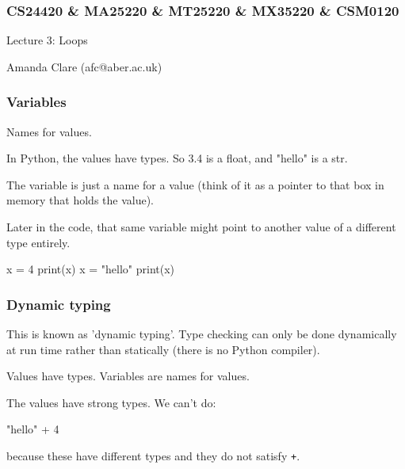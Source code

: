 \documentclass{beamer}
\begin{document}

\begin{frame}
\frametitle{CS24420 \& MA25220 \& MT25220 \& MX35220 \& CSM0120}

\begin{center}
\begin{huge}
Lecture 3: Loops
\end{huge}

\bigskip

Amanda Clare (afc@aber.ac.uk)

\end{center}
\end{frame}


\begin{frame}[fragile]
\frametitle{Variables}
Names for values. 

\bigskip

In Python, the values have types. So 3.4 is a float,
and "hello" is a str. 

\bigskip

The variable is just a name for a value (think
of it as a pointer to that box in memory that holds the value). 

\bigskip

Later in the code, that same variable might point to another value of
a different type entirely.

\begin{code}
x = 4
print(x)
x = "hello"
print(x)
\end{code}

\end{frame}



\begin{frame}[fragile]
\frametitle{Dynamic typing}
This is known as 'dynamic typing'. Type checking can only be done
dynamically at
run time rather than statically (there is no Python compiler). 
 
\bigskip

Values have types. Variables are names for values.

\bigskip

The values have strong types. We can't do: 
\begin{code}
"hello" + 4

\end{code}

because these have different types and they do not satisfy \texttt{+}.
\end{frame}
\end{document}
